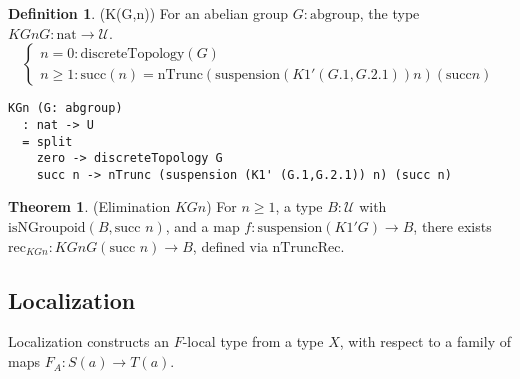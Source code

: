 \documentclass{article}
\theoremstyle{definition}
\newtheorem{theorem}{Theorem}
\newtheorem{definition}{Definition}
\begin{document}
\begin{definition} (K(G,n))
For an abelian group $G : \text{abgroup}$, the type $KGn G : \text{nat} \to \mathcal{U}$.
\[
\begin{cases}
n = 0: \text{discreteTopology}(G) \\
n \geq 1: \text{succ}(n) = \text{nTrunc}(\text{suspension}(K1' (G.1, G.2.1)) n) (\text{succ} n)
\end{cases}
\]
\begin{lstlisting}
KGn (G: abgroup)
  : nat -> U
  = split
    zero -> discreteTopology G
    succ n -> nTrunc (suspension (K1' (G.1,G.2.1)) n) (succ n)
\end{lstlisting}
\end{definition}

\begin{theorem} (Elimination $KGn$)
For $n \geq 1$, a type $B : \mathcal{U}$ with $\text{isNGroupoid}(B, \text{succ } n)$, and a map $f : \text{suspension}(K1' G) \to B$, there exists $\text{rec}_{KGn} : KGn G (\text{succ } n) \to B$, defined via $\text{nTruncRec}$.
\end{theorem}

\newpage

\subsection{Localization}
Localization constructs an $F$-local type from a type $X$, with respect to a family of maps $F_A : S(a) \to T(a)$.
\end{document}
